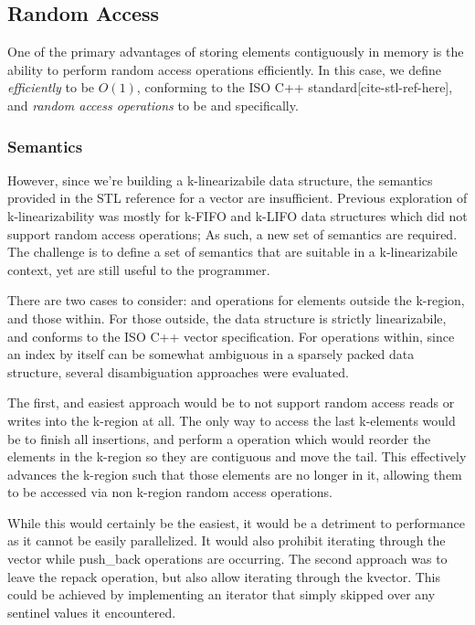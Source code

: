 \documentclass{sigplanconf}
\begin{document}
\subsection{Random Access}

One of the primary advantages of storing elements contiguously in memory is the ability to perform random access operations efficiently. In this case, we define \emph{efficiently} to be $O(1)$, conforming to the ISO C++ standard[cite-stl-ref-here], and \emph{random access operations} to be  and  specifically.

\subsubsection{Semantics}
However, since we're building a k-linearizabile data structure, the semantics provided in the STL reference for a vector are insufficient. Previous exploration of k-linearizability was mostly for k-FIFO and k-LIFO data structures which did not support random access operations; As such, a new set of semantics are required. The challenge is to define a set of semantics that are suitable in a k-linearizabile context, yet are still useful to the programmer.

There are two cases to consider:  and  operations for elements outside the k-region, and those within. For those outside, the data structure is strictly linearizabile, and conforms to the ISO C++ vector specification. For operations within, since an index by itself can be somewhat ambiguous in
a sparsely packed data structure, several disambiguation approaches were evaluated.

The first, and easiest approach would be to not support random access
reads or writes into the k-region at all. The only way to access the
last k-elements would be to finish all insertions, and perform a 
operation which would reorder the elements in the k-region so they
are contiguous and move the tail. This effectively advances the k-region such that those elements are no longer in it, allowing them to be accessed via non k-region random access operations.

While this would certainly be the easiest, it would be a detriment
to performance as it cannot be easily parallelized. It would also
prohibit iterating through the vector while push\_back operations
are occurring. The second approach was to leave the repack operation,
but also allow iterating through the kvector. This could be achieved
by implementing an iterator that simply skipped over any sentinel
values it encountered.
\end{document}

